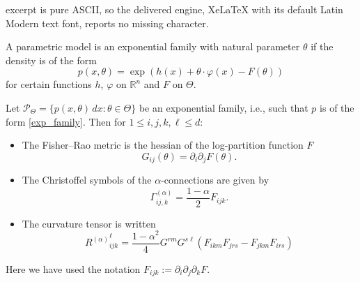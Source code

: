 \documentclass[10pt,a4paper]{amsart}
\newcommand{\R}{\mathbb R}
\begin{document}
excerpt is pure ASCII, so the delivered engine, XeLaTeX with its default Latin Modern text font, reports no missing character.
\begin{definition}
A parametric model is an exponential family with natural parameter $\theta$ if the density is of the form
\begin{equation}\label{exp_family}
p(x,\theta)=\exp(h(x)+\theta\cdot\varphi(x)-F(\theta))
\end{equation}
for certain functions $h$, $\varphi$ on $\R^n$ and $F$ on $\Theta$.
\end{definition}

\begin{lemma}\label{lem:exponential}
Let $\mathcal P_\Theta = \{p(x,\theta)\,dx: \theta\in\Theta\}$ be an exponential family, i.e., such that $p$ is of the form \eqref{exp_family}. Then for $1\leq i,j,k,\ell\leq d$:
\begin{itemize}
\item The Fisher--Rao metric is the hessian of the log-partition function $F$
\begin{equation}\label{exp_fisher_rao}
G_{ij}(\theta)=\partial_i\partial_j F(\theta).
\end{equation}
\item The Christoffel symbols of the $\alpha$-connections are given by
\begin{equation}\label{exp_alpha}
\Gamma^{(\alpha)}_{ij,k}=\frac{1-\alpha}{2}F_{ijk}.
\end{equation}
\item The curvature tensor is written
\begin{equation}\label{exp_alpha_curv}{R^{(\alpha)}}_{ijk}^\ell=\frac{1-\alpha^2}{4}G^{rm}G^{s\ell}\left(F_{ikm}F_{jrs}-F_{jkm}F_{irs}\right)
\end{equation}
\end{itemize}
Here we have used the notation $F_{ijk}:=\partial_i\partial_j\partial_kF$.
\end{lemma}
\end{document}
